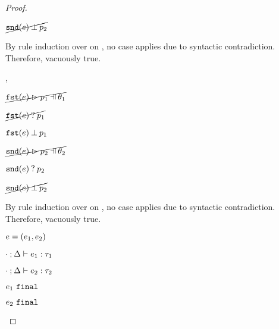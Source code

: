 \begin{proof}
\begin{byCases}
\begin{byCases}
\begin{byCases}
\begin{pfsteps*}
            \item $\cancel{\mathtt{snd}(e) \mathbin{\bot} p_2}$  
            \end{pfsteps*}
            By rule induction over  on , no case applies due to syntactic contradiction.\\
            Therefore, vacuously true.
        \item[\hnotmatch{\hfst{e}}{p_1},\hnotmatch{\hsnd{e}}{p_2}]
            \begin{pfsteps*}
            \item $\cancel{\hpatmatch{\hfst{e}}{p_1}{\theta_1}}$  
            \item $\cancel{\mathtt{fst}(e) \mathbin{?} p_1}$  
            \item $\mathtt{fst}(e) \mathbin{\bot} p_1$  
            \item $\cancel{\hpatmatch{\hsnd{e}}{p_2}{\theta_2}}$  
            \item $\mathtt{snd}(e) \mathbin{?} p_2$  
            \item $\cancel{\mathtt{snd}(e) \mathbin{\bot} p_2}$  
            \end{pfsteps*}
            By rule induction over  on , no case applies due to syntactic contradiction.\\
            Therefore, vacuously true.
        \end{byCases}
    \item[\text{(\ref{rule:TPair})}]
        \begin{pfsteps*}
        \item $e=(e_1 , e_2)$ 
        \item $\cdot \mathbin{;} \Delta \vdash e_1 : \tau_1$  
        \item $\cdot \mathbin{;} \Delta \vdash e_2 : \tau_2$  
        \item $e_1 ~\mathtt{final}$  
        \item $e_2 ~\mathtt{final}$  

\end{pfsteps*}
\end{byCases}
\end{byCases}
\end{proof}
